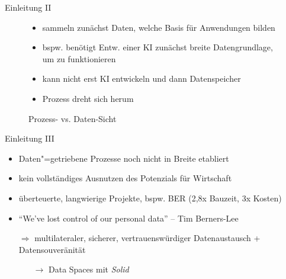 \begin{frame}{Einleitung II}
\begin{figure}
{            \begin{itemize}
                \item sammeln zunächst Daten, welche Basis für Anwendungen bilden
                \item bspw. benötigt Entw. einer KI zunächst breite Datengrundlage, um zu funktionieren
                \item kann nicht erst KI entwickeln und dann Datenspeicher
                \item Prozess dreht sich herum
            \end{itemize}
        }
        \caption{Prozess- vs. Daten-Sicht}
    \end{figure}
\end{frame}


\begin{frame}{Einleitung III}
    \begin{itemize}
        \item Daten"=getriebene Prozesse noch nicht in Breite etabliert
        \item kein vollständiges Ausnutzen des Potenzials für Wirtschaft

        \pause
        \item überteuerte, langwierige Projekte, bspw. BER (2,8x Bauzeit, 3x Kosten)~\cite{stalinskiBestBERZahlen2020}
        
        \pause
        \item \enquote{We've \alert{lost control} of our personal data} -- Tim Berners-Lee~\cite{berners-leeThreeChallengesWeb2017}
        
        \pause
        \item[$\Rightarrow$] multilateraler, sicherer, vertrauenswürdiger Datenaustausch + Datensouveränität~\cite{mollerIndustrialDataEcosystems2024}
        \pause
        \begin{itemize}
            \item[$\to$] Data Spaces mit \emph{Solid}~\cite{mecklerWebLinkedData2023}
        \end{itemize}
    \end{itemize}
\end{frame}
